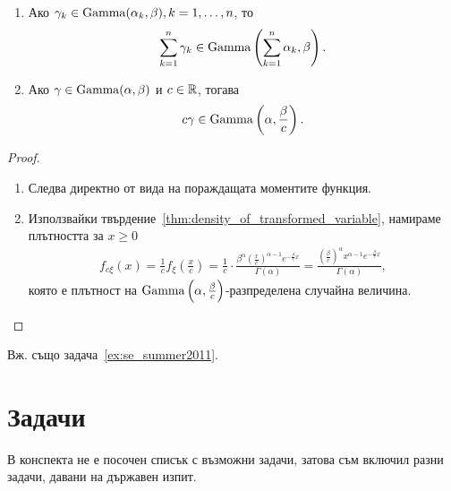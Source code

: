 \documentclass[numbers=endperiod, bibliography=totocnumbered]{scrartcl}
\begin{document}
\begin{proposition}\label{thm:gamma_linear_combination_is_gamma}
  \mbox{}
  \begin{enumerate}
    \item Ако \( \gamma_k \in \operatorname{Gamma}(\alpha_k, \beta), k = 1, \ldots, n \), то
    \begin{align*}
      \sum_{k=1}^n \gamma_k \in \operatorname{Gamma}\left( \sum_{k=1}^n \alpha_k, \beta \right).
    \end{align*}

    \item Ако \( \gamma \in \operatorname{Gamma}(\alpha, \beta) \) и \( c \in \mathbb{R} \), тогава
    \begin{align*}
      c \gamma \in \operatorname{Gamma}\left(\alpha, \frac \beta c \right).
    \end{align*}
  \end{enumerate}
\end{proposition}
\begin{proof}
  \mbox{}
  \begin{enumerate}
    \item Следва директно от вида на пораждащата моментите функция.
    \item Използвайки твърдение~\ref{thm:density_of_transformed_variable}, намираме плътността за \( x \geq 0 \)
    \begin{align*}
      f_{c\xi}(x)
      =
      \frac 1 c f_\xi\left(\frac x c \right)
      =
      \frac 1 c \cdot \frac {\beta^\alpha {\left(\frac x c \right)}^{\alpha-1} e^{-\frac \beta c x}} {\Gamma(\alpha)}
      =
      \frac {{\left(\frac \beta c \right)}^\alpha x^{\alpha-1} e^{-\frac \beta c x}} {\Gamma(\alpha)},
    \end{align*}
    която е плътност на \( \operatorname{Gamma}\left(\alpha, \frac \beta c \right) \)-разпределена случайна величина.
  \end{enumerate}
\end{proof}

Вж. също задача~\ref{ex:se_summer2011}.

\section{Задачи}

В конспекта не е посочен списък с възможни задачи, затова съм включил разни задачи, давани на държавен изпит.
\end{document}
